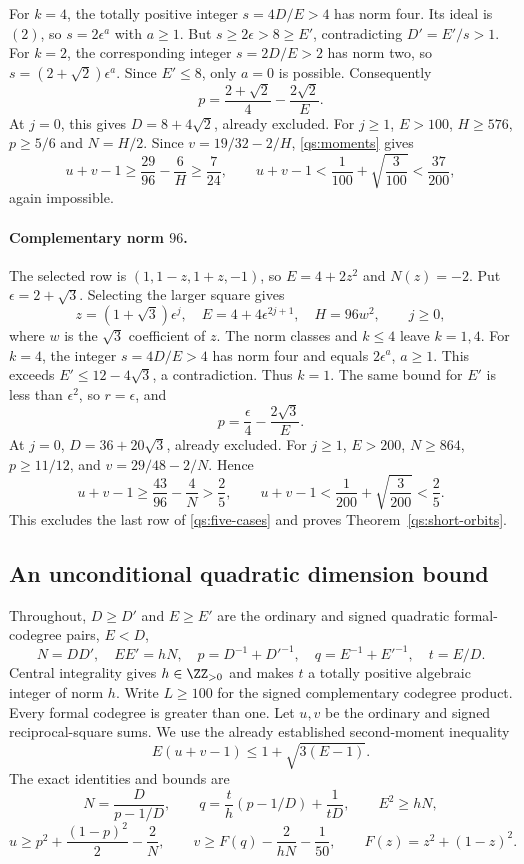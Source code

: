 For $k=4$, the totally positive integer $s=4D/E>4$ has norm four.
Its ideal is $(2)$, so $s=2\epsilon^a$ with $a\ge1$.
But $s\ge2\epsilon>8\ge E'$, contradicting $D'=E'/s>1$.
For $k=2$, the corresponding integer $s=2D/E>2$ has norm two,
so $s=(2+\sqrt2)\epsilon^a$. Since $E'\le8$, only $a=0$ is possible.
Consequently
\[
 p=\frac{2+\sqrt2}{4}-\frac{2\sqrt2}{E}.
\]
At $j=0$, this gives $D=8+4\sqrt2$, already excluded.
For $j\ge1$, $E>100$, $H\ge576$, $p\ge5/6$ and $N=H/2$.
Since $v=19/32-2/H$, \eqref{qs:moments} gives
\[
 u+v-1\ge\frac{29}{96}-\frac6H\ge\frac7{24},
 \qquad
 u+v-1<\frac1{100}+\sqrt{\frac3{100}}<\frac{37}{200},
\]
again impossible.

\paragraph{Complementary norm $96$.}
The selected row is $(1,1-z,1+z,-1)$, so $E=4+2z^2$
and $N(z)=-2$.
Put $\epsilon=2+\sqrt3$. Selecting the larger square gives
\[
 z=(1+\sqrt3)\epsilon^j,\quad E=4+4\epsilon^{2j+1},\quad
 H=96w^2,\qquad j\ge0,
\]
where $w$ is the $\sqrt3$ coefficient of $z$.
The norm classes and $k\le4$ leave $k=1,4$.
For $k=4$, the integer $s=4D/E>4$ has norm four and equals
$2\epsilon^a$, $a\ge1$. This exceeds
$E'\le12-4\sqrt3$, a contradiction. Thus $k=1$.
The same bound for $E'$ is less than $\epsilon^2$, so $r=\epsilon$,
and
\[
 p=\frac\epsilon4-\frac{2\sqrt3}{E}.
\]
At $j=0$, $D=36+20\sqrt3$, already excluded.
For $j\ge1$, $E>200$, $N\ge864$, $p\ge11/12$, and
$v=29/48-2/N$. Hence
\[
 u+v-1\ge\frac{43}{96}-\frac4N>\frac25,
 \qquad
 u+v-1<\frac1{200}+\sqrt{\frac3{200}}<\frac25.
\]
This excludes the last row of \eqref{qs:five-cases} and proves
Theorem~\ref{qs:short-orbits}.

\subsection{An unconditional quadratic dimension bound}\label{quad:opt:section}

Throughout, $D\ge D'$ and $E\ge E'$ are the ordinary and signed
quadratic formal-codegree pairs, $E<D$,
\[
 N=DD',\quad EE'=hN,\quad p=D^{-1}+D'^{-1},\quad
 q=E^{-1}+E'^{-1},\quad t=E/D.
\]
Central integrality gives $h\in\ZZ_{>0}$ and makes $t$ a totally
positive algebraic integer of norm $h$. Write $L\ge100$ for the signed complementary
codegree product. Every formal codegree is greater than one. Let $u,v$ be the ordinary and signed
reciprocal-square sums. We use the already established second-moment
inequality
\[
 E(u+v-1)\le1+\sqrt{3(E-1)}.
\]
The exact identities and bounds are
\[
 N=\frac D{p-1/D},\qquad
 q=\frac t h(p-1/D)+\frac1{tD},\qquad E^2\ge hN,
\]
\[
 u\ge p^2+\frac{(1-p)^2}{2}-\frac2N,\qquad
 v\ge F(q)-\frac2{hN}-\frac1{50},\qquad F(z)=z^2+(1-z)^2.
\]


